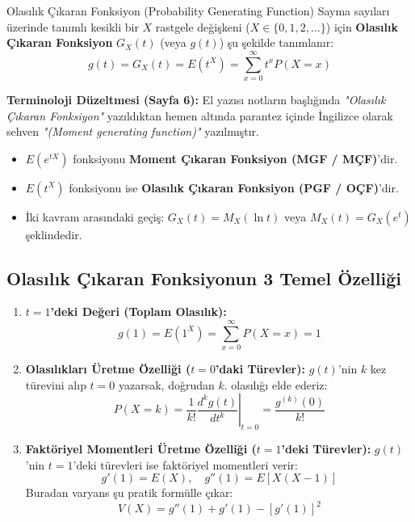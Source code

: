 \documentclass[12pt,a4paper]{article}
\begin{document}
\begin{tanim}{Olasılık Çıkaran Fonksiyon (Probability Generating Function)}
Sayma sayıları üzerinde tanımlı kesikli bir $X$ rastgele değişkeni ($X \in \{0, 1, 2, \dots\}$) için \textbf{Olasılık Çıkaran Fonksiyon} $G_X(t)$ (veya $g(t)$) şu şekilde tanımlanır:
\begin{equation}
    g(t) = G_X(t) = E(t^X) = \sum_{x=0}^{\infty} t^x P(X = x)
\end{equation}
\end{tanim}

\begin{uyari}
\textbf{Terminoloji Düzeltmesi (Sayfa 6):}
El yazısı notların başlığında \textit{"Olasılık Çıkaran Fonksiyon"} yazıldıktan hemen altında parantez içinde İngilizce olarak sehven \textit{"(Moment generating function)"} yazılmıştır.
\begin{itemize}
    \item $E(e^{tX})$ fonksiyonu \textbf{Moment Çıkaran Fonksiyon (MGF / MÇF)}'dir.
    \item $E(t^X)$ fonksiyonu ise \textbf{Olasılık Çıkaran Fonksiyon (PGF / OÇF)}'dir.
    \item İki kavram arasındaki geçiş: $G_X(t) = M_X(\ln t)$ veya $M_X(t) = G_X(e^t)$ şeklindedir.
\end{itemize}
\end{uyari}

\subsection{Olasılık Çıkaran Fonksiyonun 3 Temel Özelliği}
\begin{enumerate}
    \item \textbf{$t=1$'deki Değeri (Toplam Olasılık):}
    \begin{equation}
        g(1) = E(1^X) = \sum_{x=0}^{\infty} P(X = x) = 1
    \end{equation}

    \item \textbf{Olasılıkları Üretme Özelliği ($t=0$'daki Türevler):}
    $g(t)$'nin $k$ kez türevini alıp $t=0$ yazarsak, doğrudan $k$. olasılığı elde ederiz:
    \begin{equation}
        \boxed{P(X = k) = \frac{1}{k!} \left. \frac{d^k g(t)}{dt^k} \right|_{t=0} = \frac{g^{(k)}(0)}{k!}}
    \end{equation}

    \item \textbf{Faktöriyel Momentleri Üretme Özelliği ($t=1$'deki Türevler):}
    $g(t)$'nin $t=1$'deki türevleri ise faktöriyel momentleri verir:
    \begin{equation}
        g'(1) = E(X), \quad g''(1) = E[X(X-1)]
    \end{equation}
    Buradan varyans şu pratik formülle çıkar:
    \begin{equation}
        \boxed{V(X) = g''(1) + g'(1) - [g'(1)]^2}
    \end{equation}
\end{enumerate}
\end{document}
